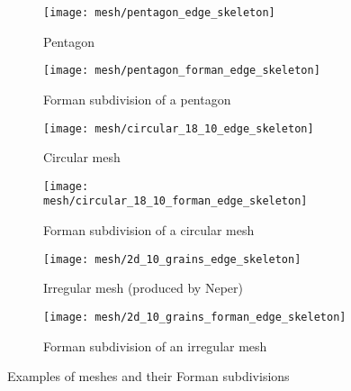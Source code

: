\begin{figure}[!ht]
  \begin{subfigure}{.5\textwidth}
    \centering
    \texttt{[image: mesh/pentagon\_edge\_skeleton]}
    \caption{Pentagon}
  \end{subfigure}
  \begin{subfigure}{.5\textwidth}
    \centering
    \texttt{[image: mesh/pentagon\_forman\_edge\_skeleton]}
    \caption{Forman subdivision of a pentagon}
  \end{subfigure}

  \begin{subfigure}{.5\textwidth}
    \centering
    \texttt{[image: mesh/circular\_18\_10\_edge\_skeleton]}
    \caption{Circular mesh}
  \end{subfigure}
  \begin{subfigure}{.5\textwidth}
    \centering
    \texttt{[image: mesh/circular\_18\_10\_forman\_edge\_skeleton]}
    \caption{Forman subdivision of a circular mesh}
  \end{subfigure}

  \begin{subfigure}{.5\textwidth}
    \centering
    \texttt{[image: mesh/2d\_10\_grains\_edge\_skeleton]}
    \caption{Irregular mesh (produced by Neper)}
  \end{subfigure}
  \begin{subfigure}{.5\textwidth}
    \centering
    \texttt{[image: mesh/2d\_10\_grains\_forman\_edge\_skeleton]}
    \caption{Forman subdivision of an irregular mesh}
  \end{subfigure}
  \caption{Examples of meshes and their Forman subdivisions}
  \label{figure:mesh/forman_subdivision_examples}
\end{figure}
